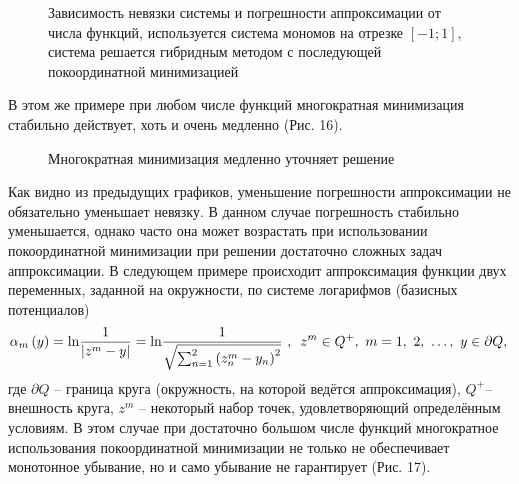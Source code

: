 ﻿\documentclass[a4paper, 12pt]{article}
\begin{document}
\begin{figure}[h!]
    \noindent{}
   \caption{Зависимость невязки системы и погрешности аппроксимации от числа функций, используется система мономов на отрезке $[-1;1]$, система решается гибридным методом с последующей покоординатной минимизацией}
    \label{figCurves}
\end{figure}

В этом же примере при любом числе функций многократная минимизация стабильно действует, хоть и очень медленно (Рис. 16).

\begin{figure}[h!]
    \noindent{}
   \caption{Многократная минимизация медленно уточняет решение}
    \label{figCurves}
\end{figure}

Как видно из предыдущих графиков, уменьшение погрешности аппроксимации не обязательно уменьшает невязку. В данном случае погрешность стабильно уменьшается, однако часто она может возрастать при использовании покоординатной минимизации при решении достаточно сложных задач аппроксимации. В следующем примере происходит аппроксимация функции двух переменных, заданной на окружности, по системе логарифмов (базисных потенциалов)
\begin{equation}{\alpha }_m\left(y\right)={\mathrm{ln} \frac{1}{\left|z^m-y\right|}={\mathrm{ln} \frac{1}{\sqrt{\sum^{\mathrm{2}\ }_{n=1}{{\left(z^m_n-y_n\right)}^2}}}\ },\ }\ z^m\in Q^+,\ m=1,\ 2,\ \dots ,\ y\in \partial Q,\\\end{equation} 
где  $\partial Q$ -- граница круга (окружность, на которой ведётся аппроксимация), $Q^+$-- внешность круга, $z^m$ -- некоторый набор точек, удовлетворяющий определённым условиям. В этом случае при достаточно большом числе функций многократное использования покоординатной минимизации не только не обеспечивает монотонное убывание, но и само убывание не гарантирует (Рис. 17).
\end{document}

